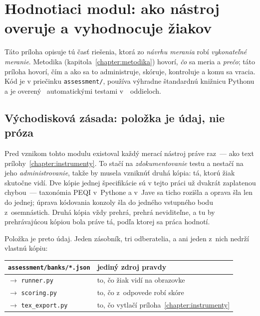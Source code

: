 \chapter{Hodnotiaci modul: ako nástroj overuje a vyhodnocuje žiakov}
\label{chapter:hodnotiaci-modul}

Táto príloha opisuje tú časť riešenia, ktorá zo \emph{návrhu merania} robí
\emph{vykonateľné meranie}. Metodika (kapitola~\ref{chapter:metodika}) hovorí,
\emph{čo} sa meria a \emph{prečo}; táto príloha hovorí, čím a ako sa to
administruje, skóruje, kontroluje a komu sa vracia. Kód je v priečinku
\texttt{assessment/}, používa výhradne štandardnú knižnicu Pythonu a je overený
\instrTests{}~automatickými testami v~\instrTestSections{}~oddieloch.

\section{Východisková zásada: položka je údaj, nie próza}
\label{sec:bank-zasada}

Pred vznikom tohto modulu existoval každý merací nástroj práve raz~--- ako text
prílohy~\ref{chapter:instrumenty}. To stačí na \emph{zdokumentovanie} testu a
nestačí na jeho \emph{administrovanie}, takže by musela vzniknúť druhá kópia: tá,
ktorú žiak skutočne vidí. Dve kópie jednej špecifikácie sú v tejto práci už dvakrát
zaplatenou chybou~--- taxonómia PEQI v~Pythone a v~Jave sa ticho rozišla a oprava
šla len do jednej; úprava kódovania konzoly šla do jedného vstupného bodu z~osemnástich.
Druhá kópia vždy prehrá, prehrá neviditeľne, a tu by prehrávajúcou kópiou bola
práve tá, podľa ktorej sa práca hodnotí.

Položka je preto údaj. Jeden zásobník, tri odberatelia, a ani jeden z~nich nedrží
vlastnú kópiu:

\begin{center}
\small
\begin{tabular}{@{}ll@{}}
\toprule
\texttt{assessment/banks/*.json} & \textbf{jediný zdroj pravdy} \\
\midrule
$\rightarrow$ \texttt{runner.py}     & to, čo žiak vidí na obrazovke \\
$\rightarrow$ \texttt{scoring.py}    & to, čo z~odpovede robí skóre \\
$\rightarrow$ \texttt{tex\_export.py} & to, čo vytlačí príloha~\ref{chapter:instrumenty} \\
\bottomrule
\end{tabular}
\end{center}

